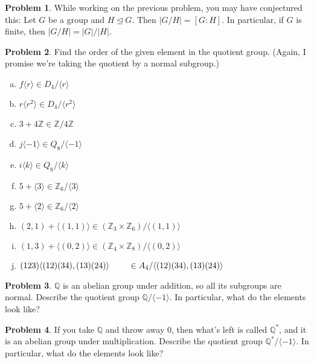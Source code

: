 \documentclass[12pt]{article}
\theoremstyle{definition} %
\newtheorem{problem}{Problem}
\newcommand{\Q}{\mathbb{Q}}
\newcommand{\Z}{\mathbb{Z}}
\def\<{\langle}
\def\>{\rangle}
\def\normaleq{\unlhd}
\begin{document}
\begin{problem}
    While working on the previous problem, you may have conjectured this: Let $G$ be a group and $H \normaleq G$. Then $|G/H| = [G:H]$. 
    In particular, if $G$ is finite, then $|G/H| = |G| / |H|$.
\end{problem}

\begin{problem}
    Find the order of the given element in the quotient group. (Again, I promise we're taking the quotient by a normal subgroup.)
    \begin{multicols}{2}
        \begin{enumerate}[(a)]
            \item $f\<r\> \in D_4 / \< r \>$
            \item $r\<r^2\> \in D_4 / \< r^2 \>$
            \item $3+4\Z \in \Z / 4\Z$
            \item $j\<-1\> \in Q_8 / \< -1 \>$
            \item $i\<k\> \in Q_8 / \< k \>$
            \item $5 + \<3\> \in \Z_6 / \< 3 \>$
            \item $5 + \<2\> \in \Z_6 / \< 2 \>$
            \item $(2, 1) + \< (1, 1) \> \in (\Z_3 \times \Z_6) / \< (1, 1) \>$
            \item $(1, 3) + \< (0 ,2) \> \in (\Z_4 \times \Z_8) / \< (0 ,2) \>$
            \item $(123) \<(12)(34), (13)(24)\> \\
            \phantom{.}\qquad \in A_4 / \<(12)(34), (13)(24)\>$
        \end{enumerate}
    \end{multicols}
\end{problem}

\begin{problem}
    $\Q$ is an abelian group under addition, so all its subgroups are normal. Describe the quotient group $\Q / \<-1\>$. In particular, what do the elements look like?
\end{problem}

\begin{problem}
    If you take $\Q$ and throw away 0, then what's left is called $\Q^*$, and it is an abelian group under multiplication. Describe the quotient group $\Q^* / \<-1\>$. In particular, what do the elements look like?
\end{problem}
\end{document}
